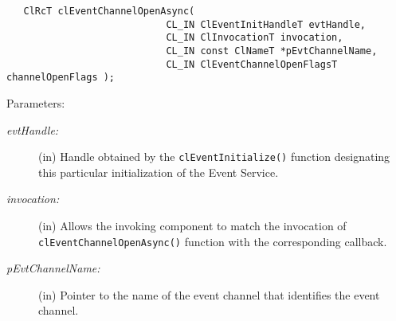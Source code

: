 \begin{flushleft}
\begin{Desc}
\footnotesize\begin{verbatim}   ClRcT clEventChannelOpenAsync(
              				CL_IN ClEventInitHandleT evtHandle,
              				CL_IN ClInvocationT invocation,
              				CL_IN const ClNameT *pEvtChannelName,
              				CL_IN ClEventChannelOpenFlagsT channelOpenFlags );
\end{verbatim}
\normalsize
\end{Desc}
\begin{Desc}
\item[Parameters:]
\begin{description}
\item[{\em evt\-Handle:}](in) Handle obtained by the {\tt{clEventInitialize()}} function designating this particular initialization of the Event Service.

\item[{\em invocation:}](in) Allows the invoking component to match the invocation of {\tt{clEventChannelOpenAsync()}} function with the 
corresponding callback.

\item[{\em p\-Evt\-Channel\-Name:}](in) Pointer to the name of the event channel that identifies the event channel.


\end{description}
\end{Desc}
\end{flushleft}
